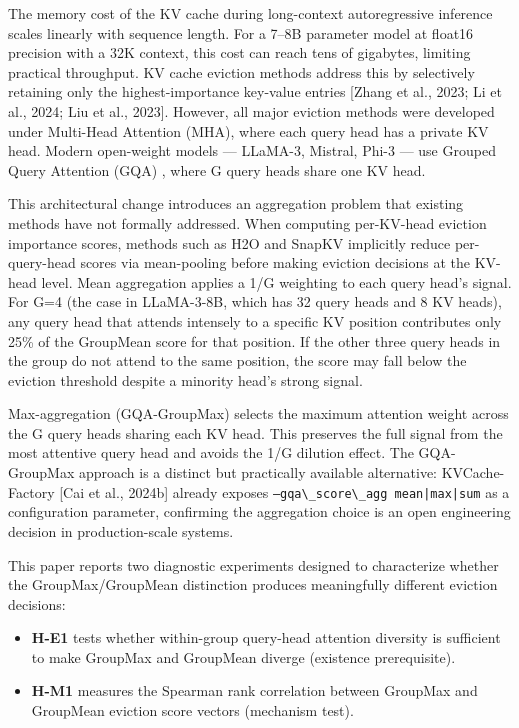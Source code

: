 
The memory cost of the KV cache during long-context autoregressive inference scales linearly with sequence length. For a 7--8B parameter model at float16 precision with a 32K context, this cost can reach tens of gigabytes, limiting practical throughput. KV cache eviction methods address this by selectively retaining only the highest-importance key-value entries [Zhang et al., 2023; Li et al., 2024; Liu et al., 2023]. However, all major eviction methods were developed under Multi-Head Attention (MHA), where each query head has a private KV head. Modern open-weight models --- LLaMA-3, Mistral, Phi-3 --- use Grouped Query Attention (GQA) \citep{Ainslie2023GQA}, where G query heads share one KV head.

This architectural change introduces an aggregation problem that existing methods have not formally addressed. When computing per-KV-head eviction importance scores, methods such as H2O \citep{Zhang2023H2O} and SnapKV \citep{Li2024SnapKV} implicitly reduce per-query-head scores via mean-pooling before making eviction decisions at the KV-head level. Mean aggregation applies a 1/G weighting to each query head's signal. For G=4 (the case in LLaMA-3-8B, which has 32 query heads and 8 KV heads), any query head that attends intensely to a specific KV position contributes only 25\% of the GroupMean score for that position. If the other three query heads in the group do not attend to the same position, the score may fall below the eviction threshold despite a minority head's strong signal.

Max-aggregation (GQA-GroupMax) selects the maximum attention weight across the G query heads sharing each KV head. This preserves the full signal from the most attentive query head and avoids the 1/G dilution effect. The GQA-GroupMax approach is a distinct but practically available alternative: KVCache-Factory [Cai et al., 2024b] already exposes \texttt{--gqa\textbackslash \_score\textbackslash \_agg mean|max|sum} as a configuration parameter, confirming the aggregation choice is an open engineering decision in production-scale systems.

This paper reports two diagnostic experiments designed to characterize whether the GroupMax/GroupMean distinction produces meaningfully different eviction decisions:

\begin{itemize}
\item \textbf{H-E1} tests whether within-group query-head attention diversity is sufficient to make GroupMax and GroupMean diverge (existence prerequisite).
\item \textbf{H-M1} measures the Spearman rank correlation between GroupMax and GroupMean eviction score vectors (mechanism test).
\end{itemize}

